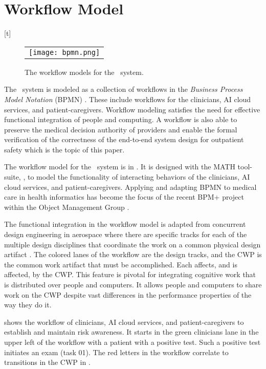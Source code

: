 \section{Workflow Model}[t]
\begin{figure*}
  \begin{center}
    \begin{tabular}{c}
      \texttt{[image: bpmn.png]}
    \end{tabular}
  \end{center}
\caption{The workflow models for the \phware\ system.}
\label{fig:bpmn}
\end{figure*}

The \phware\ system is modeled as a collection of workflows in the \emph{Business Process Model Notation} (BPMN) \cite{BPMNSpecification}. These include workflows for the clinicians, AI cloud services, and patient-caregivers. Workflow modeling satisfies the need for effective functional integration of people and computing. A workflow is also able to preserve the medical decision authority of providers and enable the formal verification of the correctness of the end-to-end system design for outpatient safety which is the topic of this paper.

The workflow model for the \phware\ system is in . It is designed with the MATH tool-suite, \cite{workflowmodel}, to model the functionality of interacting behaviors of the clinicians, AI cloud services, and patient-caregivers. Applying and adapting BPMN to medical care in health informatics has become the focus of the recent BPM+ project within the Object Management Group \cite{bpm}. 

The functional integration in the workflow model is adapted from concurrent design engineering in aerospace where there are specific tracks for each of the multiple design disciplines that coordinate the work on a common physical design artifact \cite{10.1007/978-1-4471-1538-0_9}. The colored lanes of the workflow are the design tracks, and the CWP is the common work artifact that must be accomplished. Each affects, and is affected, by the CWP. This feature is pivotal for integrating cognitive work that is distributed over people and computers. It allows people and computers to share work on the CWP despite vast differences in the performance properties of the way they do it. 

 shows the workflow of clinicians, AI cloud services, and patient-caregivers to establish and maintain risk awareness. It starts in the green clinicians lane in the upper left of the workflow with a patient with a positive test. Such a positive test initiates an exam (task 01). The red letters in the workflow correlate to transitions in the CWP in . 

